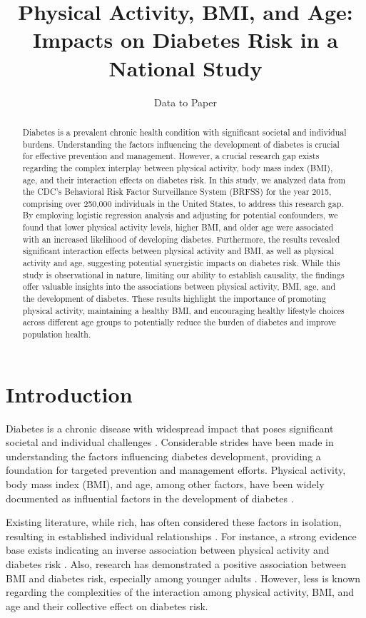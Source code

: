 \documentclass[11pt]{article}
\title{Physical Activity, BMI, and Age: Impacts on Diabetes Risk in a National Study}
\author{Data to Paper}
\begin{document}
\maketitle
\begin{abstract}Diabetes is a prevalent chronic health condition with significant societal and individual burdens. Understanding the factors influencing the development of diabetes is crucial for effective prevention and management. However, a crucial research gap exists regarding the complex interplay between physical activity, body mass index (BMI), age, and their interaction effects on diabetes risk. In this study, we analyzed data from the CDC's Behavioral Risk Factor Surveillance System (BRFSS) for the year 2015, comprising over 250,000 individuals in the United States, to address this research gap. By employing logistic regression analysis and adjusting for potential confounders, we found that lower physical activity levels, higher BMI, and older age were associated with an increased likelihood of developing diabetes. Furthermore, the results revealed significant interaction effects between physical activity and BMI, as well as physical activity and age, suggesting potential synergistic impacts on diabetes risk. While this study is observational in nature, limiting our ability to establish causality, the findings offer valuable insights into the associations between physical activity, BMI, age, and the development of diabetes. These results highlight the importance of promoting physical activity, maintaining a healthy BMI, and encouraging healthy lifestyle choices across different age groups to potentially reduce the burden of diabetes and improve population health.\end{abstract}
\section*{Introduction}

Diabetes is a chronic disease with widespread impact that poses significant societal and individual challenges \cite{Bohn2015ImpactOP, Akter2014PrevalenceOD}. Considerable strides have been made in understanding the factors influencing diabetes development, providing a foundation for targeted prevention and management efforts. Physical activity, body mass index (BMI), and age, among other factors, have been widely documented as influential factors in the development of diabetes \cite{Eckert2012ImpactOP, Chan1994ObesityFD}. 

Existing literature, while rich, has often considered these factors in isolation, resulting in established individual relationships \cite{Singh2013TheAQ}. For instance, a strong evidence base exists indicating an inverse association between physical activity and diabetes risk \cite{Zhao2020PhysicalAL}. Also, research has demonstrated a positive association between BMI and diabetes risk, especially among younger adults \cite{Chen2018AssociationOB}. However, less is known regarding the complexities of the interaction among physical activity, BMI, and age and their collective effect on diabetes risk. 
\end{document}
